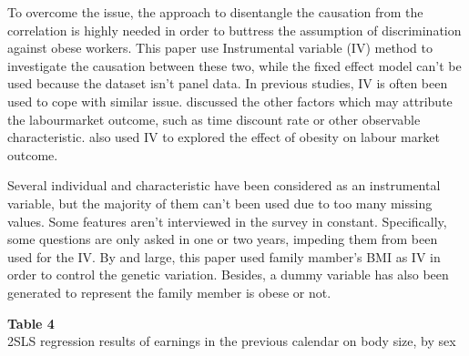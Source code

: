 \documentclass{article}
\begin{document}
\par
\setlength{\parindent}{2em}
To overcome the issue, the approach to disentangle the causation from the correlation is highly needed in order to buttress the assumption of discrimination against obese workers. This paper use Instrumental variable (IV) method to investigate the causation between these two, while the fixed effect model can't be used because the dataset isn't panel data. In previous studies, IV is often been used to cope with similar issue. \citet{cawley2004impact} discussed the other factors which may attribute the labourmarket outcome, such as time discount rate or other observable characteristic. \citet{greve2008obesity} also used IV to explored the effect of obesity on labour market outcome.
\par
\setlength{\parindent}{2em}
Several individual and characteristic have been considered as an instrumental variable, but the majority of them can't been used due to too many missing values. Some features aren't interviewed in the survey in constant. Specifically, some questions are only asked in one or two years, impeding them from been used for the IV. By and large, this paper used family mamber's BMI as IV in order to control the genetic variation. Besides, a dummy variable has also been generated to represent the family member is obese or not.

\vspace{20pt}

\noindent
\textbf{Table 4} \\
2SLS regression results of earnings in the previous calendar on body size, by sex
\end{document}
